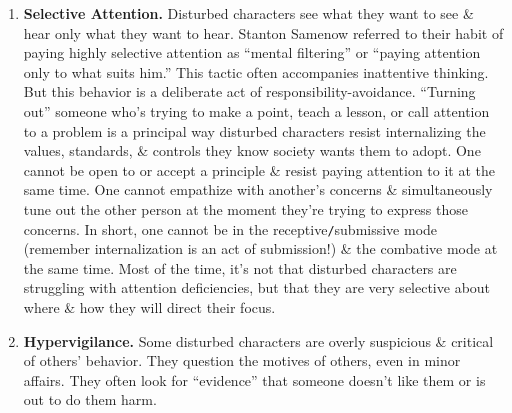 \documentclass{article}
\numberwithin{equation}{section}
\begin{document}
\begin{enumerate}
	\item \textbf{Selective Attention.} Disturbed characters see what they want to see \& hear only what they want to hear. Stanton Samenow referred to their habit of paying highly selective attention as ``mental filtering'' or ``paying attention only to what suits him.'' This tactic often accompanies inattentive thinking. But this behavior is a deliberate act of responsibility-avoidance. ``Turning out'' someone who's trying to make a point, teach a lesson, or call attention to a problem is a principal way disturbed characters resist internalizing the values, standards, \& controls they know society wants them to adopt. One cannot be open to or accept a principle \& resist paying attention to it at the same time. One cannot empathize with another's concerns \& simultaneously tune out the other person at the moment they're trying to express those concerns. In short, one cannot be in the receptive\texttt{/}submissive mode (remember internalization is an act of submission!) \& the combative mode at the same time. Most of the time, it's not that disturbed characters are struggling with attention deficiencies, but that they are very selective about where \& how they will direct their focus.
	\item \textbf{Hypervigilance.} Some disturbed characters are overly suspicious \& critical of others' behavior. They question the motives of others, even in minor affairs. They often look for ``evidence'' that someone doesn't like them or is out to do them harm.
	

\end{enumerate}
\end{document}
